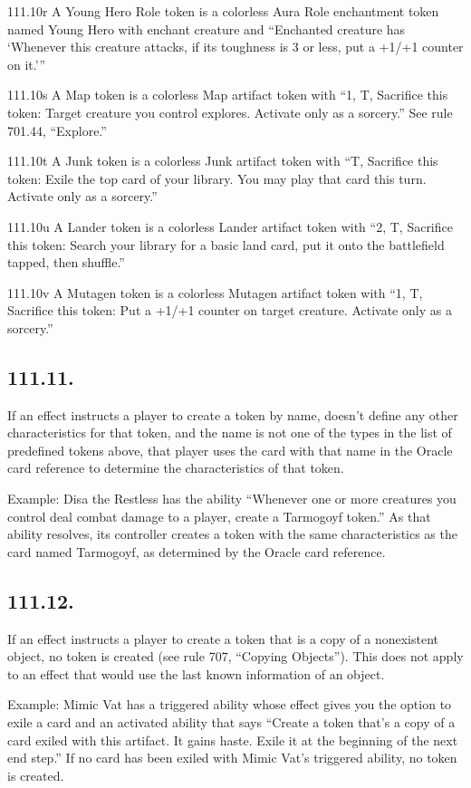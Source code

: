111.10r A Young Hero Role token is a colorless Aura Role enchantment token named Young Hero with enchant creature and “Enchanted creature has ‘Whenever this creature attacks, if its toughness is 3 or less, put a +1/+1 counter on it.’”

111.10s A Map token is a colorless Map artifact token with “{1}, {T}, Sacrifice this token: Target creature you control explores. Activate only as a sorcery.” See rule 701.44, “Explore.”

111.10t A Junk token is a colorless Junk artifact token with “{T}, Sacrifice this token: Exile the top card of your library. You may play that card this turn. Activate only as a sorcery.”

111.10u A Lander token is a colorless Lander artifact token with “{2}, {T}, Sacrifice this token: Search your library for a basic land card, put it onto the battlefield tapped, then shuffle.”

111.10v A Mutagen token is a colorless Mutagen artifact token with “{1}, {T}, Sacrifice this token: Put a +1/+1 counter on target creature. Activate only as a sorcery.”

\subsection*{111.11.}
If an effect instructs a player to create a token by name, doesn’t define any other characteristics for that token, and the name is not one of the types in the list of predefined tokens above, that player uses the card with that name in the Oracle card reference to determine the characteristics of that token.

Example: Disa the Restless has the ability “Whenever one or more creatures you control deal combat damage to a player, create a Tarmogoyf token.” As that ability resolves, its controller creates a token with the same characteristics as the card named Tarmogoyf, as determined by the Oracle card reference.

\subsection*{111.12.}
If an effect instructs a player to create a token that is a copy of a nonexistent object, no token is created (see rule 707, “Copying Objects”). This does not apply to an effect that would use the last known information of an object.

Example: Mimic Vat has a triggered ability whose effect gives you the option to exile a card and an activated ability that says “Create a token that’s a copy of a card exiled with this artifact. It gains haste. Exile it at the beginning of the next end step.” If no card has been exiled with Mimic Vat’s triggered ability, no token is created.

